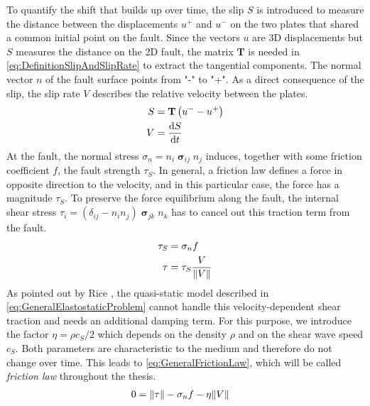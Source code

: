 To quantify the shift that builds up over time, the slip $S$ is introduced to measure the distance between the displacements $u^+$ and $u^-$ on the two plates that shared a common initial point on the fault. Since the vectors $u$ are 3D displacements but $S$ measures the distance on the 2D fault, the matrix $\mathbf{T}$ is needed  in \autoref{eq:DefinitionSlipAndSlipRate} to extract the tangential components. The normal vector $n$ of the fault surface points from "-" to "+". As a direct consequence of the slip, the slip rate $V$ describes the relative velocity between the plates.
\begin{align}
	\label{eq:DefinitionSlipAndSlipRate}
	S &= \mathbf{T}\left(u^- - u^+\right) \\
	V &= \dv{S}{t}
\end{align}
At the fault, the normal stress $\sigma_n = n_i\bm{\upsigma}_{ij}n_j$ induces, together with some friction coefficient $f$, the fault strength $\tau_S$. In general, a friction law defines a force in opposite direction to the velocity, and in this particular case, the force has a magnitude $\tau_S$. To preserve the force equilibrium along the fault, the internal shear stress $\tau_i=(\delta_{ij}-n_in_j)\bm{\upsigma}_{jk}n_k$ has to cancel out this traction term from the fault. 
\begin{align}
	\tau_S &= \sigma_n f \\
	\tau &= \tau_S\frac{V}{\norm{V}} 
\end{align}
As pointed out by Rice \cite{GeneralSEASSimulations}, the quasi-static model described in \autoref{eq:GeneralElastostaticProblem} cannot handle this velocity-dependent shear traction and needs an additional damping term. For this purpose, we introduce the factor $\eta=\rho c_S/2$ which depends on the density $\rho$ and on the shear wave speed $c_S$. Both parameters are characteristic to the medium and therefore do not change over time. This leads to \autoref{eq:GeneralFrictionLaw}, which will be called \textit{friction law} throughout the thesis. 
\begin{align}
	\label{eq:GeneralFrictionLaw}
	0 &= \norm{\tau} - \sigma_n f - \eta \norm{V}
\end{align}

